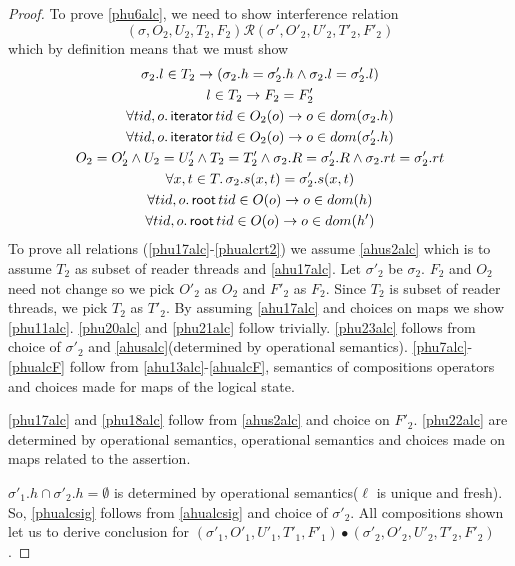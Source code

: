\begin{proof}
To prove \ref{phu6alc}, we need to show interference relation
\[(\sigma, O_2, U_2, T_2,F_2) \mathcal{R} (\sigma', O'_2, U'_2, T'_2,F'_2)  \]
which by definition means that we must show 
\begin{gather}\label{phu17alc}
  \sigma_2.l  \in  T_2 \rightarrow (\sigma_2.h =\sigma'_2.h \land \sigma_2.l=\sigma'_2.l)\\
  \label{phu18alc}
  l\in T_2\rightarrow F_2=F_2'\\
  \label{phu20alc}
  \forall tid,o\ldotp\textsf{iterator} \, tid \in O_2(o) \rightarrow o \in dom(\sigma_2.h) \\
  \label{phu21alc}
  \forall tid,o\ldotp\textsf{iterator} \, tid \in O_2(o) \rightarrow o \in dom(\sigma'_2.h) \\
  \label{phu22alc}
  O_2 = O_2' \land U_2 = U_2' \land T_2 = T_2'\land \sigma_2.R = \sigma'_2.R \land \sigma_2.rt = \sigma'_2.rt \\
  \label{phu23alc}
  \forall x, t \in T \ldotp \sigma_2.s(x,t) = \sigma'_2.s(x,t) \\
    \label{phualcrt1}
  \forall tid,o\ldotp\textsf{root} \, tid \in O(o) \rightarrow o \in dom(h) \\
  \label{phualcrt2}
  \forall tid,o\ldotp\textsf{root} \, tid \in O(o) \rightarrow o \in dom(h') 
\end{gather}
To prove all relations (\ref{phu17alc}-\ref{phualcrt2}) we assume \ref{ahus2alc} which is to assume $T_2$ as subset of reader threads and \ref{ahu17alc}. Let $\sigma'_2$ be $\sigma_2$. $F_2$ and $O_2$ need not change so we pick $O'_2$  as $O_2$ and $F'_2$ as $F_2$. Since $T_2$ is subset of reader threads, we pick $T_2$ as  $T'_2$. By assuming \ref{ahu17alc} and choices on maps we show \ref{phu11alc}. \ref{phu20alc} and \ref{phu21alc} follow trivially. \ref{phu23alc} follows from choice of $\sigma'_2$ and \ref{ahusalc}(determined by operational semantics). \ref{phu7alc}-\ref{phualcF} follow from \ref{ahu13alc}-\ref{ahualcF}, semantics of compositions operators and choices made for maps of the logical state.

\ref{phu17alc} and \ref{phu18alc} follow from \ref{ahus2alc} and choice on $F'_2$. \ref{phu22alc} are determined by operational semantics, operational semantics and choices made on maps related to the assertion.

$\sigma'_1.h \cap \sigma'_2.h = \emptyset$ is determined by operational semantics($\ell$ is unique and fresh). So, \ref{phualcsig} follows from \ref{ahualcsig} and choice of $\sigma'_2$. All compositions shown let us to derive conclusion for  $(\sigma'_1, O'_1, U'_1, T'_1,F'_1) \bullet (\sigma'_2, O'_2, U'_2, T'_2,F'_2) $.
 \end{proof}
